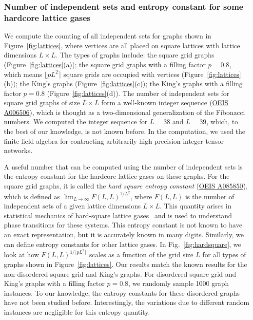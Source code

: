 \documentclass[onefignum, onetabnum]{siamart190516}
\newcommand{\<}{\langle}
\renewcommand{\>}{\rangle}
\newcommand{\Fig}[1]{Fig.~\ref{#1}}
\begin{document}
\subsubsection{Number of independent sets and entropy constant for some hardcore lattice gases}\label{sec:entropy}
We compute the counting of all independent sets for graphs shown in Figure~\ref{fig:lattices}, where vertices are all placed on square lattices with lattice dimensions $L \times L$.
The types of graphs include: the square grid graphs (Figure~\ref{fig:lattices}(a)); the square grid graphs with a filling factor $p=0.8$, which means $\lfloor pL^{2} \rceil$ square grids are occupied with vertices  (Figure~\ref{fig:lattices}(b));
the King's graphs  (Figure~\ref{fig:lattices}(c)); the King's graphs with a filling factor $p = 0.8$  (Figure~\ref{fig:lattices}(d)).
The number of independent sets for square grid graphs of size $L \times L$ form a well-known integer sequence (\href{https://oeis.org/A006506}{OEIS A006506}), which is thought as a two-dimensional generalization of the Fibonacci numbers.
We computed the integer sequence for $L=38$ and $L=39$, which, to the best of our knowledge, is not known before.
In the computation, we used the finite-field algebra for contracting arbitrarily high precision integer tensor networks. 

A useful number that can be computed using the number of independent sets is the entropy constant for the hardcore lattice gases on these graphs. For the square grid graphs, it is called the \textit{hard square entropy constant} (\href{https://oeis.org/A085850}{OEIS A085850}), which is defined as $\lim_{L\rightarrow \infty} F(L,L)^{1/L^2}$, where $F(L,L)$ is the number of independent sets of a given lattice dimensions $L \times L$. This quantity arises in statistical mechanics of hard-square lattice gases~\cite{Baxter1980, Pearce1988} and is used to understand phase transitions for these systems. This entropy constant is not known to have an exact representation, but it is accurately known in many digits. Similarly, we can define entropy constants for other lattice gases. In \Fig{fig:hardsquare}, we look at how $F(L,L)^{1/\lfloor pL^2\rceil}$ scales as a function of the grid size $L$ for all types of graphs shown in Figure~\ref{fig:lattices}. Our results match the known results for the non-disordered square grid and King's graphs. For disordered square grid and King's graphs with a filling factor $p=0.8$, we randomly sample 1000 graph instances. To our knowledge, the entropy constants for these disordered graphs have not been studied before. Interestingly, the variations due to different random instances are negligible for this entropy quantity. 
\end{document}
